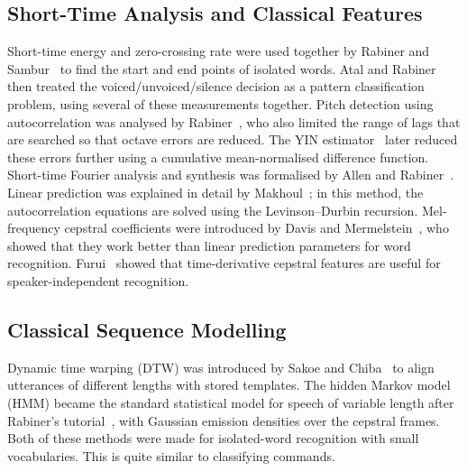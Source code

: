 \documentclass[conference]{IEEEtran}
\begin{document}
\subsection{Short-Time Analysis and Classical Features}
Short-time energy and zero-crossing rate were used together by Rabiner and Sambur~\cite{rabiner1975endpoints} to find the start and end points of isolated words. Atal and Rabiner~\cite{atal1976vus} then treated the voiced/unvoiced/silence decision as a pattern classification problem, using several of these measurements together. Pitch detection using autocorrelation was analysed by Rabiner~\cite{rabiner1977pitch}, who also limited the range of lags that are searched so that octave errors are reduced. The YIN estimator~\cite{decheveigne2002yin} later reduced these errors further using a cumulative mean-normalised difference function. Short-time Fourier analysis and synthesis was formalised by Allen and Rabiner~\cite{allen1977stft}. Linear prediction was explained in detail by Makhoul~\cite{makhoul1975lp}; in this method, the autocorrelation equations are solved using the Levinson--Durbin recursion. Mel-frequency cepstral coefficients were introduced by Davis and Mermelstein~\cite{davis1980mfcc}, who showed that they work better than linear prediction parameters for word recognition. Furui~\cite{furui1986delta} showed that time-derivative cepstral features are useful for speaker-independent recognition.

\subsection{Classical Sequence Modelling}
Dynamic time warping (DTW) was introduced by Sakoe and Chiba~\cite{sakoe1978dtw} to align utterances of different lengths with stored templates. The hidden Markov model (HMM) became the standard statistical model for speech of variable length after Rabiner's tutorial~\cite{rabiner1989hmm}, with Gaussian emission densities over the cepstral frames. Both of these methods were made for isolated-word recognition with small vocabularies. This is quite similar to classifying commands.
\end{document}
